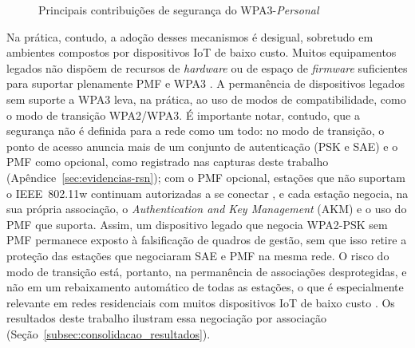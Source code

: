 \begin{figure}[htb]
\centering
\caption{Principais contribuições de segurança do WPA3-\textit{Personal}}
\label{fig:wpa3_sae_pmf}
\end{figure}

Na prática, contudo, a adoção desses mecanismos é desigual, sobretudo em ambientes compostos por dispositivos IoT de baixo custo. Muitos equipamentos legados não dispõem de recursos de \textit{hardware} ou de espaço de \textit{firmware} suficientes para suportar plenamente PMF e WPA3 \cite{Lima2025}. A permanência de dispositivos legados sem suporte a WPA3 leva, na prática, ao uso de modos de compatibilidade, como o modo de transição WPA2/WPA3. É importante notar, contudo, que a segurança não é definida para a rede como um todo: no modo de transição, o ponto de acesso anuncia mais de um conjunto de autenticação (PSK e SAE) e o PMF como opcional, como registrado nas capturas deste trabalho (Apêndice~\ref{sec:evidencias-rsn}); com o PMF opcional, estações que não suportam o IEEE~802.11w continuam autorizadas a se conectar \cite{CiscoMFP2024}, e cada estação negocia, na sua própria associação, o \textit{Authentication and Key Management} (AKM) e o uso do PMF que suporta. Assim, um dispositivo legado que negocia WPA2-PSK sem PMF permanece exposto à falsificação de quadros de gestão, sem que isso retire a proteção das estações que negociaram SAE e PMF na mesma rede. O risco do modo de transição está, portanto, na permanência de associações desprotegidas, e não em um rebaixamento automático de todas as estações, o que é especialmente relevante em redes residenciais com muitos dispositivos IoT de baixo custo \cite{Hassija2019,Lima2025}. Os resultados deste trabalho ilustram essa negociação por associação (Seção~\ref{subsec:consolidacao_resultados}).

